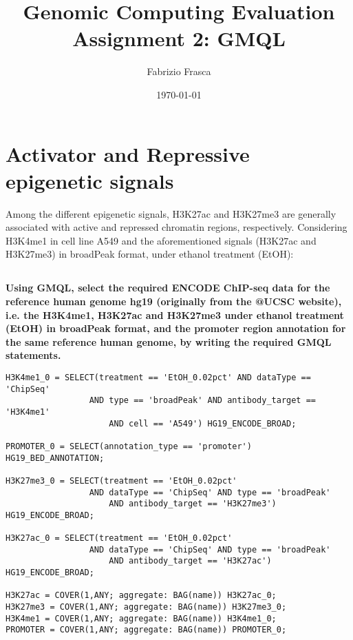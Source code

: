 \documentclass[12pt, a4paper]{article}
\title{\textbf{Genomic Computing Evaluation}\\Assignment 2: GMQL}
\author{Fabrizio Frasca}
\date{\today}
\begin{document}
	
\maketitle
\clearpage

\section{Activator and Repressive epigenetic signals} \label{ex_1}

Among the different epigenetic signals, H3K27ac and H3K27me3 are generally associated with active and repressed chromatin regions, respectively. Considering H3K4me1 in cell line A549 and the aforementioned signals (H3K27ac and H3K27me3) in broadPeak format, under ethanol treatment (EtOH):

\subsection{}

\textbf{Using GMQL, select the required ENCODE ChIP-seq data for the reference human genome hg19 (originally from the @UCSC website), i.e. the H3K4me1, H3K27ac and H3K27me3 under ethanol treatment (EtOH) in broadPeak format, and the promoter region annotation for the same reference human genome, by writing the required GMQL statements.}

\begin{verbatim}
H3K4me1_0 = SELECT(treatment == 'EtOH_0.02pct' AND dataType == 'ChipSeq'
                 AND type == 'broadPeak' AND antibody_target == 'H3K4me1'
                     AND cell == 'A549') HG19_ENCODE_BROAD;

PROMOTER_0 = SELECT(annotation_type == 'promoter') HG19_BED_ANNOTATION;

H3K27me3_0 = SELECT(treatment == 'EtOH_0.02pct'
                 AND dataType == 'ChipSeq' AND type == 'broadPeak'
                     AND antibody_target == 'H3K27me3') HG19_ENCODE_BROAD;

H3K27ac_0 = SELECT(treatment == 'EtOH_0.02pct'
                 AND dataType == 'ChipSeq' AND type == 'broadPeak'
                     AND antibody_target == 'H3K27ac') HG19_ENCODE_BROAD;

H3K27ac = COVER(1,ANY; aggregate: BAG(name)) H3K27ac_0;
H3K27me3 = COVER(1,ANY; aggregate: BAG(name)) H3K27me3_0;
H3K4me1 = COVER(1,ANY; aggregate: BAG(name)) H3K4me1_0;
PROMOTER = COVER(1,ANY; aggregate: BAG(name)) PROMOTER_0;
\end{verbatim}
\end{document}
